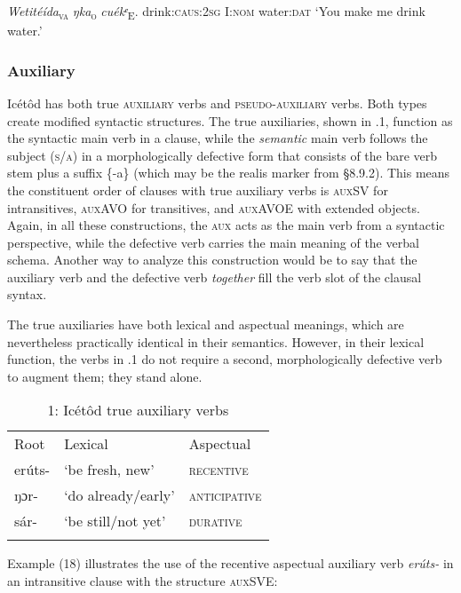 \textit{Wetitéída}\textsc{\textsubscript{va}}\textit{}   \textit{ŋka}\textsc{\textsubscript{o}}\textit{     cuékᵉ}\textsc{\textsubscript{E}}.
drink:\textsc{caus:2sg} I:\textsc{nom}    water:\textsc{dat}
‘You make me drink water.’




\subsubsection{Auxiliary} 

Icétôd has both true \textsc{auxiliary} verbs and \textsc{pseudo-auxiliary} verbs. Both types create modified syntactic structures. The true auxiliaries, shown in .1, function as the syntactic main verb in a clause, while the \textit{semantic} main verb follows the subject (\textsc{s/a}) in a morphologically defective form that consists of the bare verb stem plus a suffix \{-a\} (which may be the realis marker from §8.9.2). This means the constituent order of clauses with true auxiliary verbs is \textsc{auxSV} for intransitives, \textsc{auxAVO} for transitives, and \textsc{auxAVOE} with extended objects. Again, in all these constructions, the \textsc{aux} acts as the main verb from a syntactic perspective, while the defective verb carries the main meaning of the verbal schema. Another way to analyze this construction would be to say that the auxiliary verb and the defective verb \textit{together} fill the verb slot of the clausal syntax.

The true auxiliaries have both lexical and aspectual meanings, which are nevertheless practically identical in their semantics. However, in their lexical function, the verbs in .1 do not require a second, morphologically defective verb to augment them; they stand alone.


\begin{table}
\caption{1: Icétôd true auxiliary verbs}
\label{tab:10}


\begin{tabularx}{\textwidth}{XXX}
\lsptoprule

Root & Lexical & Aspectual\\
erúts- & ‘be fresh, new’ & \textsc{recentive}\\
ŋɔr- & ‘do already/early’ & \textsc{anticipative}\\
sár- & ‘be still/not yet’ & \textsc{durative}\\
\lspbottomrule
\end{tabularx}
\end{table}
Example (18) illustrates the use of the recentive aspectual auxiliary verb \textit{erúts-} in an intransitive clause with the structure \textsc{auxSVE:}




